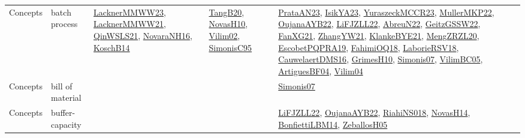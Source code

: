 {\begin{longtable}{lp{3cm}>{\raggedright}p{6cm}>{\raggedright}p{6cm}p{8cm}}
Concepts & batch process & \href{articles/LacknerMMWW23.pdf}{LacknerMMWW23}\cite{LacknerMMWW23}, \href{papers/LacknerMMWW21.pdf}{LacknerMMWW21}\cite{LacknerMMWW21}, \href{articles/QinWSLS21.pdf}{QinWSLS21}\cite{QinWSLS21}, \href{articles/NovaraNH16.pdf}{NovaraNH16}\cite{NovaraNH16}, \href{papers/KoschB14.pdf}{KoschB14}\cite{KoschB14} & \href{papers/TangB20.pdf}{TangB20}\cite{TangB20}, \href{articles/NovasH10.pdf}{NovasH10}\cite{NovasH10}, \href{papers/Vilim02.pdf}{Vilim02}\cite{Vilim02}, \href{papers/SimonisC95.pdf}{SimonisC95}\cite{SimonisC95} & \href{articles/PrataAN23.pdf}{PrataAN23}\cite{PrataAN23}, \href{articles/IsikYA23.pdf}{IsikYA23}\cite{IsikYA23}, \href{articles/YuraszeckMCCR23.pdf}{YuraszeckMCCR23}\cite{YuraszeckMCCR23}, \href{articles/MullerMKP22.pdf}{MullerMKP22}\cite{MullerMKP22}, \href{papers/OujanaAYB22.pdf}{OujanaAYB22}\cite{OujanaAYB22}, \href{papers/LiFJZLL22.pdf}{LiFJZLL22}\cite{LiFJZLL22}, \href{articles/AbreuN22.pdf}{AbreuN22}\cite{AbreuN22}, \href{papers/GeitzGSSW22.pdf}{GeitzGSSW22}\cite{GeitzGSSW22}, \href{articles/FanXG21.pdf}{FanXG21}\cite{FanXG21}, \href{articles/ZhangYW21.pdf}{ZhangYW21}\cite{ZhangYW21}, \href{papers/KlankeBYE21.pdf}{KlankeBYE21}\cite{KlankeBYE21}, \href{articles/MengZRZL20.pdf}{MengZRZL20}\cite{MengZRZL20}, \href{articles/EscobetPQPRA19.pdf}{EscobetPQPRA19}\cite{EscobetPQPRA19}, \href{articles/FahimiOQ18.pdf}{FahimiOQ18}\cite{FahimiOQ18}, \href{articles/LaborieRSV18.pdf}{LaborieRSV18}\cite{LaborieRSV18}, \href{papers/CauwelaertDMS16.pdf}{CauwelaertDMS16}\cite{CauwelaertDMS16}, \href{papers/GrimesH10.pdf}{GrimesH10}\cite{GrimesH10}, \href{articles/Simonis07.pdf}{Simonis07}\cite{Simonis07}, \href{articles/VilimBC05.pdf}{VilimBC05}\cite{VilimBC05}, \href{papers/ArtiguesBF04.pdf}{ArtiguesBF04}\cite{ArtiguesBF04}, \href{papers/Vilim04.pdf}{Vilim04}\cite{Vilim04}\\
Concepts & bill of material &  &  & \href{articles/Simonis07.pdf}{Simonis07}\cite{Simonis07}\\
Concepts & buffer-capacity &  &  & \href{papers/LiFJZLL22.pdf}{LiFJZLL22}\cite{LiFJZLL22}, \href{papers/OujanaAYB22.pdf}{OujanaAYB22}\cite{OujanaAYB22}, \href{papers/RiahiNS018.pdf}{RiahiNS018}\cite{RiahiNS018}, \href{articles/NovasH14.pdf}{NovasH14}\cite{NovasH14}, \href{articles/BonfiettiLBM14.pdf}{BonfiettiLBM14}\cite{BonfiettiLBM14}, \href{articles/ZeballosH05.pdf}{ZeballosH05}\cite{ZeballosH05}\\

\end{longtable}}
